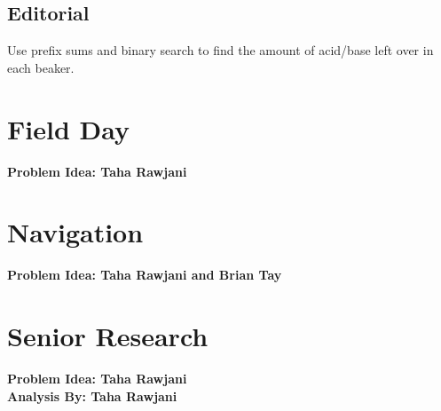 \documentclass{article}
\begin{document}
\subsection{Editorial}
Use prefix sums and binary search to find the amount of acid/base left over in each beaker.
\section{Field Day}
\textbf{Problem Idea: Taha Rawjani}
\section{Navigation}
\textbf{Problem Idea: Taha Rawjani and Brian Tay}
\newpage
\section{Senior Research}
\textbf{Problem Idea: Taha Rawjani\\Analysis By: Taha Rawjani}
\end{document}
